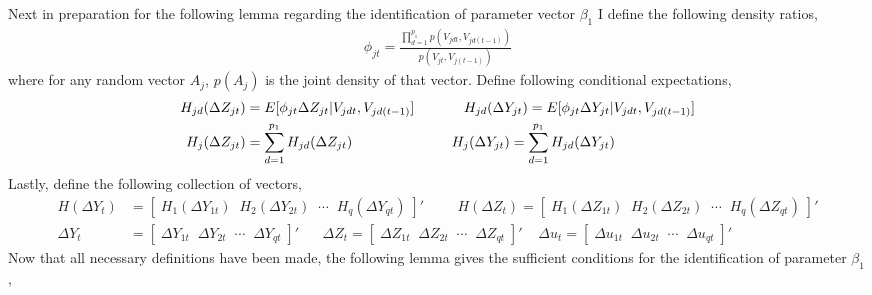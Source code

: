 \documentclass[10pt]{article}
\begin{document}
\noindent Next in preparation for the following lemma regarding the identification of parameter vector $\beta_1$ I define the following density ratios, 
\begin{align*} 
\phi_{jt} = \frac{ \prod_{d=1}^{p_1}p(V_{jdt},V_{jd(t-1)}) }{p(V_{jt},V_{j(t-1)})} 
\end{align*}
where for any random vector $A_{j}$, $p(A_{j})$ is the joint density of that vector. Define following conditional expectations, 
\begin{align*} 
H_{jd}(\Delta Z_{jt}) &= E[\phi_{jt} \Delta Z_{jt} |V_{jdt},V_{jd(t-1)}] \hspace{1.25cm} 
%
H_{jd}(\Delta Y_{jt}) = E[\phi_{jt} \Delta Y_{jt} |V_{jdt},V_{jd(t-1)}] \\
%
H_j(\Delta Z_{jt}) &= \sum_{d=1}^{p_1} H_{jd}(\Delta Z_{jt})  \hspace{2.5cm}
%
H_j(\Delta Y_{jt}) = \sum_{d=1}^{p_1} H_{jd}(\Delta Y_{jt})  \end{align*} 
Lastly, define the following collection of vectors, 
\begin{align*}
H(\Delta Y_t)  &= [ \; H_1(\Delta Y_{1t}) \;\; H_2(\Delta Y_{2t}) \;\; \cdots \;\; H_q(\Delta Y_{qt}) \; ]'
\hspace{1cm} 
H(\Delta Z_t)  = [ \; H_1(\Delta Z_{1t}) \;\; H_2(\Delta Z_{2t}) \;\; \cdots \;\; H_q(\Delta Z_{qt}) \; ]' \\
%
\Delta Y_t &= [ \; \Delta Y_{1t} \;\;  \Delta Y_{2t} \;\; \cdots \;\; \Delta Y_{qt} \;] '  \;\;\;\;\;\; \Delta Z_t = [ \; \Delta Z_{1t} \;\;  \Delta Z_{2t} \;\; \cdots \;\; \Delta Z_{qt} \;] ' 
\;\;\;\; \Delta u_t =  [ \; \Delta u_{1t} \;\;  \Delta u_{2t} \;\; \cdots \;\; \Delta u_{qt} \;] ' 
\end{align*}
Now that all necessary definitions have been made, the following lemma gives the sufficient conditions for the identification of parameter $\beta_1$, 
\end{document}

